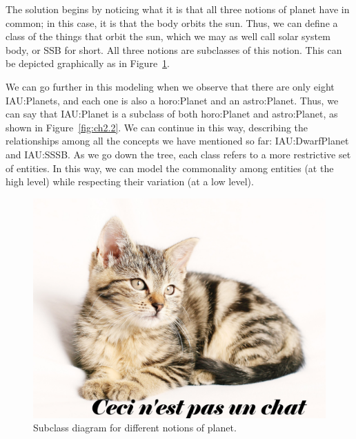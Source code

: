 The solution begins by noticing what it is that all three notions of
planet have in common; in this case, it is that the body orbits the sun.
Thus, we can define a class of the things that orbit the sun, which we
may as well call solar system body, or SSB for short. All three notions
are subclasses of this notion. This can be depicted graphically as in
Figure~\ref{fig:ch2.1}.

We can go further in this modeling when we observe that there are only
eight IAU:Planets, and each one is also a horo:Planet and an
astro:Planet. Thus, we can say that IAU:Planet is a subclass of both
horo:Planet and astro:Planet, as shown in Figure~\ref{fig:ch2.2}. We can continue in
this way, describing the relationships among all the concepts we have
mentioned so far: IAU:DwarfPlanet and IAU:SSSB. As we go down the tree,
each class refers to a more restrictive set of entities. In this way, we
can model the commonality among entities (at the high level) while
respecting their variation (at a low level).


\begin{figure}
    \centering
    \includegraphics[width=5.0in]{media/imageX.jpg}
    \caption{Subclass diagram for different notions of planet.}
    \label{fig:ch2.1}
\end{figure}


